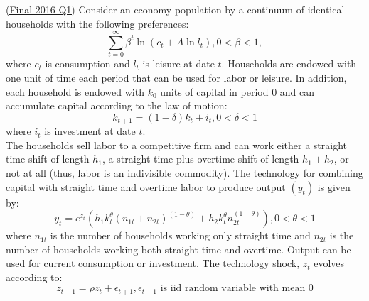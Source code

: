 \documentclass[answers]{exam}
\begin{document}
\begin{questions}
    \question \href{https://drive.google.com/file/d/1Oc2RsQ-J3MtMMVoAwpuAdPodoOrIJZmm/view}{(Final 2016 Q1)}
    Consider an economy population by a continuum of identical households with the following preferences:
    $$\sum_{t=0}^{\infty} \beta^t \ln(c_t + A \ln l_t), 0 < \beta < 1, $$
    where $c_t$ is consumption and $l_t$ is leisure at date $t$. Households are endowed with one unit of time each period that can be used for labor or leisure. In addition, each household is endowed with $k_0$ units of capital in period 0 and can accumulate capital according to the law of motion:
    $$k_{t+1} = (1-\delta) k_t + i_t, 0 < \delta < 1$$
    where $i_t$ is investment at date $t$.\\
    The households sell labor to a competitive firm and can work either a straight time shift of length $h_1$, a straight time plus overtime shift of length $h_1+h_2$, or not at all (thus, labor is an indivisible commodity). The technology for combining capital with straight time and overtime labor to produce output $(y_t)$ is given by:
    $$y_t = e^{z_t}(h_1 k_t^\theta (n_{1t}+n_{2t})^{(1-\theta)} + h_2 k_t^\theta n_{2t}^{(1-\theta)}), 0 < \theta < 1$$
    where $n_{1t}$ is the number of households working only straight time and $n_{2t}$ is the number of households working both straight time and overtime. Output can be used for current consumption or investment. The technology shock, $z_t$ evolves according to:
    $$z_{t+1} = \rho z_t + \epsilon_{t+1}, \epsilon_{t+1} \text{ is iid random variable with mean 0}$$
    \begin{parts}

\end{parts}
\end{questions}
\end{document}
